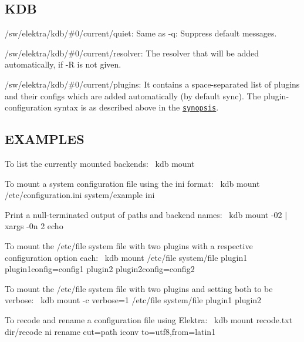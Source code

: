 \subsection*{K\+DB}


\begin{DoxyItemize}
\item {\ttfamily /sw/elektra/kdb/\#0/current/quiet}\+: Same as {\ttfamily -\/q}\+: Suppress default messages.
\item {\ttfamily /sw/elektra/kdb/\#0/current/resolver}\+: The resolver that will be added automatically, if {\ttfamily -\/R} is not given.
\item {\ttfamily /sw/elektra/kdb/\#0/current/plugins}\+: It contains a space-\/separated list of plugins and their configs which are added automatically (by default sync). The plugin-\/configuration syntax is as described above in the \href{#SYNOPSIS}{\tt synopsis}.
\end{DoxyItemize}

\subsection*{E\+X\+A\+M\+P\+L\+ES}

To list the currently mounted backends\+:~\newline
 {\ttfamily kdb mount}

To mount a system configuration file using the ini format\+:~\newline
 {\ttfamily kdb mount /etc/configuration.ini system/example ini}

Print a null-\/terminated output of paths and backend names\+:~\newline
 {\ttfamily kdb mount -\/02 $\vert$ xargs -\/0n 2 echo}

To mount the /etc/file system file with two plugins with a respective configuration option each\+:~\newline
 {\ttfamily kdb mount /etc/file system/file plugin1 plugin1config=config1 plugin2 plugin2config=config2}

To mount the /etc/file system file with two plugins and setting both to be verbose\+:~\newline
 {\ttfamily kdb mount -\/c verbose=1 /etc/file system/file plugin1 plugin2}

To recode and rename a configuration file using Elektra\+:~\newline
 {\ttfamily kdb mount recode.\+txt dir/recode ni rename cut=path iconv to=utf8,from=latin1}

